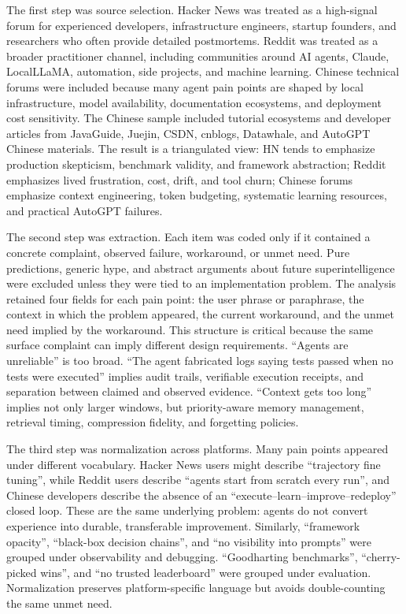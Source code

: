 The first step was source selection. Hacker News was treated as a high-signal forum for experienced developers, infrastructure engineers, startup founders, and researchers who often provide detailed postmortems. Reddit was treated as a broader practitioner channel, including communities around AI agents, Claude, LocalLLaMA, automation, side projects, and machine learning. Chinese technical forums were included because many agent pain points are shaped by local infrastructure, model availability, documentation ecosystems, and deployment cost sensitivity. The Chinese sample included tutorial ecosystems and developer articles from JavaGuide, Juejin, CSDN, cnblogs, Datawhale, and AutoGPT Chinese materials. The result is a triangulated view: HN tends to emphasize production skepticism, benchmark validity, and framework abstraction; Reddit emphasizes lived frustration, cost, drift, and tool churn; Chinese forums emphasize context engineering, token budgeting, systematic learning resources, and practical AutoGPT failures.

The second step was extraction. Each item was coded only if it contained a concrete complaint, observed failure, workaround, or unmet need. Pure predictions, generic hype, and abstract arguments about future superintelligence were excluded unless they were tied to an implementation problem. The analysis retained four fields for each pain point: the user phrase or paraphrase, the context in which the problem appeared, the current workaround, and the unmet need implied by the workaround. This structure is critical because the same surface complaint can imply different design requirements. ``Agents are unreliable'' is too broad. ``The agent fabricated logs saying tests passed when no tests were executed'' implies audit trails, verifiable execution receipts, and separation between claimed and observed evidence. ``Context gets too long'' implies not only larger windows, but priority-aware memory management, retrieval timing, compression fidelity, and forgetting policies.

The third step was normalization across platforms. Many pain points appeared under different vocabulary. Hacker News users might describe ``trajectory fine tuning'', while Reddit users describe ``agents start from scratch every run'', and Chinese developers describe the absence of an ``execute--learn--improve--redeploy'' closed loop. These are the same underlying problem: agents do not convert experience into durable, transferable improvement. Similarly, ``framework opacity'', ``black-box decision chains'', and ``no visibility into prompts'' were grouped under observability and debugging. ``Goodharting benchmarks'', ``cherry-picked wins'', and ``no trusted leaderboard'' were grouped under evaluation. Normalization preserves platform-specific language but avoids double-counting the same unmet need.

